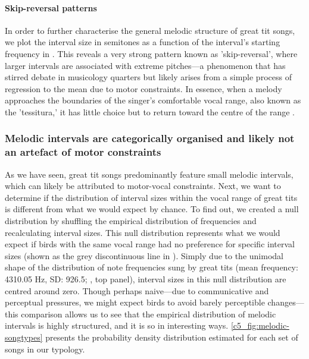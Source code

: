 \paragraph{Skip-reversal patterns}
In order to further characterise the general melodic structure of great tit songs, we plot the interval size in semitones as a function of the interval's starting frequency in . This reveals a very strong pattern known as 'skip-reversal', where larger intervals are associated with extreme pitches---a phenomenon that has stirred debate in musicology quarters \autocite{vonhippel2000} but likely arises from a simple process of regression to the mean due to motor constraints. In essence, when a melody approaches the boundaries of the singer's comfortable vocal range, also known as the 'tessitura,' it has little choice but to return toward the centre of the range \autocite{tierney2008, vonhippel2000, vonhippel2000a}. 



\subsubsection{Melodic intervals are categorically organised and likely not an artefact of motor constraints}
As we have seen, great tit songs predominantly feature small melodic intervals, which can likely be attributed to motor-vocal constraints. Next, we want to determine if the distribution of interval sizes within the vocal range of great tits is different from what we would expect by chance. To find out, we created a null distribution by shuffling the empirical distribution of frequencies and recalculating interval sizes. This null distribution represents what we would expect if birds with the same vocal range had no preference for specific interval sizes (shown as the grey discontinuous line in ). Simply due to the unimodal shape of the distribution of note frequencies sung by great tits (mean frequency: 4310.05 Hz, SD: 926.5; , top panel), interval sizes in this null distribution are centred around zero. Though perhaps naive---due to communicative and perceptual pressures, we might expect birds to avoid barely perceptible changes---this comparison allows us to see that the empirical distribution of melodic intervals is highly structured, and it is so in interesting ways. \autoref{c5_fig:melodic-songtypes} presents the probability density distribution estimated for each set of songs in our typology.


